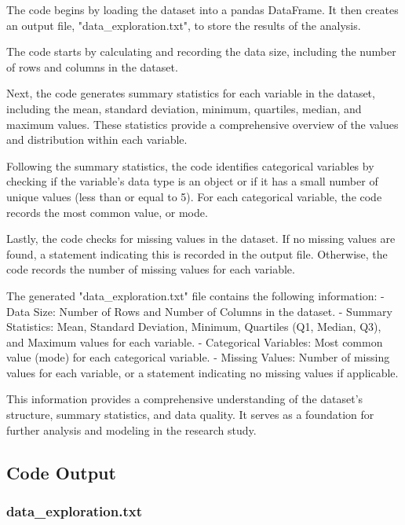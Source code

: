 \documentclass[11pt]{article}
\begin{document}
The code begins by loading the dataset into a pandas DataFrame. It then creates an output file, "data\_exploration.txt", to store the results of the analysis.

The code starts by calculating and recording the data size, including the number of rows and columns in the dataset.

Next, the code generates summary statistics for each variable in the dataset, including the mean, standard deviation, minimum, quartiles, median, and maximum values. These statistics provide a comprehensive overview of the values and distribution within each variable.

Following the summary statistics, the code identifies categorical variables by checking if the variable's data type is an object or if it has a small number of unique values (less than or equal to 5). For each categorical variable, the code records the most common value, or mode.

Lastly, the code checks for missing values in the dataset. If no missing values are found, a statement indicating this is recorded in the output file. Otherwise, the code records the number of missing values for each variable.

The generated "data\_exploration.txt" file contains the following information:
- Data Size: Number of Rows and Number of Columns in the dataset.
- Summary Statistics: Mean, Standard Deviation, Minimum, Quartiles (Q1, Median, Q3), and Maximum values for each variable.
- Categorical Variables: Most common value (mode) for each categorical variable.
- Missing Values: Number of missing values for each variable, or a statement indicating no missing values if applicable.

This information provides a comprehensive understanding of the dataset's structure, summary statistics, and data quality. It serves as a foundation for further analysis and modeling in the research study.

\subsection{Code Output}

\subsubsection*{data\_exploration.txt}
\end{document}
